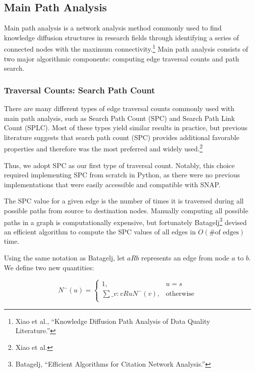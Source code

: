 \documentclass[lettepaper,]{article}
\begin{document}
\hypertarget{main-path-analysis}{%
\subsection{Main Path Analysis}\label{main-path-analysis}}

Main path analysis is a network analysis method commonly used to find
knowledge diffusion structures in research fields through identifying a
series of connected nodes with the maximum connectivity.\footnote{Xiao
  et al., ``Knowledge Diffusion Path Analysis of Data Quality
  Literature.''} Main path analysis consists of two major algorithmic
components: computing edge traversal counts and path search.

\hypertarget{traversal-counts-search-path-count}{%
\subsubsection{Traversal Counts: Search Path
Count}\label{traversal-counts-search-path-count}}

There are many different types of edge traversal counts commonly used
with main path analysis, such as Search Path Count (SPC) and Search Path
Link Count (SPLC). Most of these types yield similar results in
practice, but previous literature suggests that search path count (SPC)
provides additional favorable properties and therefore was the most
preferred and widely used.\footnote{Xiao et al.}

Thus, we adopt SPC as our first type of traversal count. Notably, this
choice required implementing SPC from scratch in Python, as there were
no previous implementations that were easily accessible and compatible
with SNAP.

The SPC value for a given edge is the number of times it is traversed
during all possible paths from source to destination nodes. Manually
computing all possible paths in a graph is computationally expensive,
but fortunately Batagelj\footnote{Batagelj, ``Efficient Algorithms for
  Citation Network Analysis.''} devised an efficient algorithm to
compute the SPC values of all edges in \(O(\text{\# of edges})\) time.

Using the same notation as Batagelj, let \(aRb\) represents an edge from
node \(a\) to \(b\). We define two new quantities:

\[N^{-}(u) = \begin{cases}
1, & u = s \\
\sum\_{v:vRu} N^{-}(v), & \text{otherwise} \\
\end{cases} \]
\end{document}
